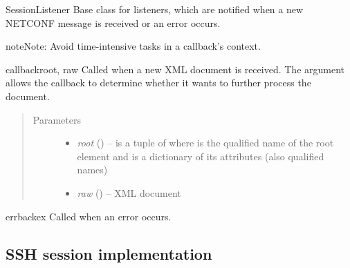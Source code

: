 \documentclass[a4paper,10pt,english]{manual}
\begin{document}
\hypertarget{ncclient.transport.SessionListener}{}\begin{classdesc}{SessionListener}{}
Base class for \hyperlink{ncclient.transport.Session}{} listeners, which are notified when a new
NETCONF message is received or an error occurs.

\begin{notice}{note}{Note:}
Avoid time-intensive tasks in a callback's context.
\end{notice}

\hypertarget{ncclient.transport.SessionListener.callback}{}\begin{methoddesc}{callback}{root, raw}
Called when a new XML document is received. The  argument
allows the callback to determine whether it wants to further process the
document.
\begin{quote}\begin{description}
\item[Parameters]\begin{itemize}
\item {} 
\emph{root} (\href{http://docs.python.org/library/functions.html\#tuple}{}) -- is a tuple of  where  is the qualified name of the root element and  is a dictionary of its attributes (also qualified names)

\item {} 
\emph{raw} (\href{http://docs.python.org/library/string.html\#string}{}) -- XML document

\end{itemize}

\end{description}\end{quote}
\end{methoddesc}

\hypertarget{ncclient.transport.SessionListener.errback}{}\begin{methoddesc}{errback}{ex}
Called when an error occurs.
\begin{quote}\begin{description}
\end{description}\end{quote}
\end{methoddesc}
\end{classdesc}


\subsection{SSH session implementation}
\end{document}
